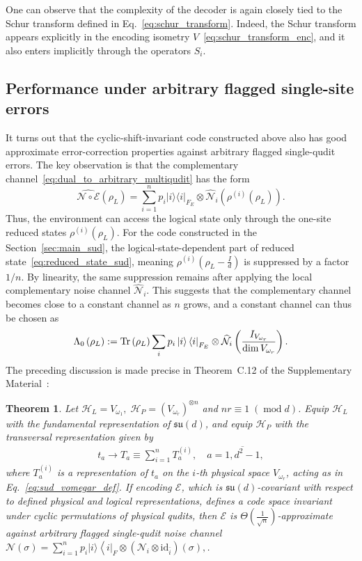 \documentclass[10pt,twocolumn,superscriptaddress,aps,amsmath,amssymb,citeautoscript,floatfix,prx,longbibliography]{revtex4-2}
\newtheorem{theorem}{Theorem}
\theoremstyle{plain}
\theoremstyle{plain}
\theoremstyle{plain}
\theoremstyle{plain}
\theoremstyle{plain}
\theoremstyle{plain}
\begin{document}
One can observe that the complexity of the decoder is again closely tied to the Schur transform defined in Eq.~\eqref{eq:schur_transform}. Indeed, the Schur transform appears explicitly in the encoding isometry \(V\)~\eqref{eq:schur_transform_enc}, and it also enters implicitly through the operators \(S_i\).

\subsection{Performance under arbitrary flagged single-site errors}\label{subsec:main_arb_noise}

It turns out that the cyclic-shift-invariant code constructed above also has good approximate error-correction properties against arbitrary flagged single-qudit errors. The key observation is that the complementary channel~\eqref{eq:dual_to_arbitrary_multiqudit} has the form
\[
    \widehat{\mathcal N\circ\mathcal E}(\rho_L)
    =
    \sum_{i=1}^n
    p_i |i\rangle\langle i|_{F_E}
    \otimes
    \widehat{\mathcal N}_i\!\left(\rho^{(i)}(\rho_L)\right).
\]
Thus, the environment can access the logical state only through the one-site reduced states \(\rho^{(i)}(\rho_L)\). For the code constructed in the Section~\ref{sec:main_sud}, the logical-state-dependent part of reduced state~\eqref{eq:reduced_state_sud}, meaning \(\rho^{(i)}\left(\rho_L-\frac{I}{d}\right)\) is suppressed by a factor \(1/n\). By linearity, the same suppression remains after applying the local complementary noise channel \(\widehat{\mathcal N}_i\). This suggests that the complementary channel becomes close to a constant channel as \(n\) grows, and a constant channel can thus be chosen as
\[
\Lambda_0\left(\rho_L\right):=\operatorname{Tr}\left(\rho_L\right) \sum_i p_i\ket{i}\bra{i}_{F_E} \otimes \widehat{\mathcal{N}}_i\left(\frac{I_{V_{\omega_r}}}{\dim V_{\omega_r}}\right).
\]
The preceding discussion is made precise in Theorem~C.12 of the Supplementary Material~\cite{SuppMat}:
\begin{theorem}
Let
$
    \mathcal H_L=V_{\omega_1},\;
    \mathcal H_P=(V_{\omega_r})^{\otimes n}
$
and $nr\equiv 1\;(\operatorname{mod} d)$.
Equip \(\mathcal H_L\) with the fundamental representation of
\(\mathfrak{su}(d)\), and equip \(\mathcal H_P\) with the transversal
representation given by
\begin{equation}
\begin{gathered}
t_a \rightarrow T_a \equiv \sum_{i=1}^n T_a^{(i)}, \quad a=\overline{1, d^2-1},
\end{gathered}
\end{equation} 
where $T_a^{(i)}$ is a representation of $t_a$ on the $i$-th physical space $V_{\omega_r}$, acting as in Eq.~\eqref{eq:sud_vomegar_def}.
If encoding $\mathcal{E}$, which is $\mathfrak{su}(d)$-covariant with respect to defined physical and logical representations,  defines a code space invariant under cyclic permutations of physical qudits, then $\mathcal{E}$ is $\Theta\left(\frac{1}{\sqrt{n}}\right)$-approximate against arbitrary flagged single-qudit noise channel $\mathcal{N}(\sigma)=\sum_{i=1}^n p_i|i\rangle\left\langle\left. i\right|_F \otimes\left(\mathcal{N}_i \otimes \mathrm{id}_{\bar{i}}\right)(\sigma),\right.$.
\end{theorem}
\end{document}
